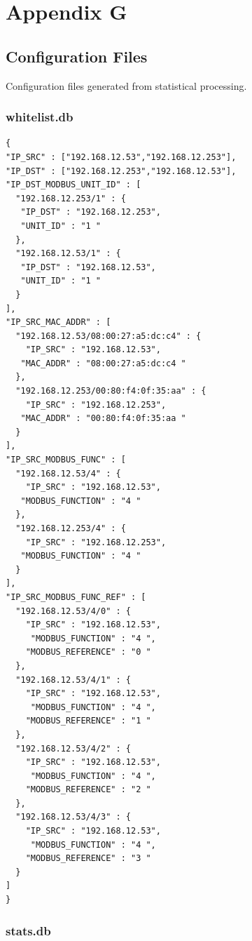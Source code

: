 \documentclass[11pt,a4paper]{article}
\begin{document}
\newpage

\section*{Appendix G}\label{appendix-g}

\subsection*{Configuration Files}\label{configuration-files}

Configuration files generated from statistical processing.

\subsubsection*{whitelist.db}\label{whitelist.db}

\begin{verbatim}
{
"IP_SRC" : ["192.168.12.53","192.168.12.253"],
"IP_DST" : ["192.168.12.253","192.168.12.53"],
"IP_DST_MODBUS_UNIT_ID" : [
  "192.168.12.253/1" : {
   "IP_DST" : "192.168.12.253",
   "UNIT_ID" : "1 "
  },
  "192.168.12.53/1" : {
   "IP_DST" : "192.168.12.53",
   "UNIT_ID" : "1 "
  }
],
"IP_SRC_MAC_ADDR" : [
  "192.168.12.53/08:00:27:a5:dc:c4" : {
    "IP_SRC" : "192.168.12.53",
   "MAC_ADDR" : "08:00:27:a5:dc:c4 "
  },
  "192.168.12.253/00:80:f4:0f:35:aa" : {
    "IP_SRC" : "192.168.12.253",
   "MAC_ADDR" : "00:80:f4:0f:35:aa "
  }
],
"IP_SRC_MODBUS_FUNC" : [
  "192.168.12.53/4" : {
    "IP_SRC" : "192.168.12.53",
   "MODBUS_FUNCTION" : "4 "
  },
  "192.168.12.253/4" : {
    "IP_SRC" : "192.168.12.253",
   "MODBUS_FUNCTION" : "4 "
  }
],
"IP_SRC_MODBUS_FUNC_REF" : [
  "192.168.12.53/4/0" : {
    "IP_SRC" : "192.168.12.53",
     "MODBUS_FUNCTION" : "4 ",
    "MODBUS_REFERENCE" : "0 "
  },
  "192.168.12.53/4/1" : {
    "IP_SRC" : "192.168.12.53",
     "MODBUS_FUNCTION" : "4 ",
    "MODBUS_REFERENCE" : "1 "
  },
  "192.168.12.53/4/2" : {
    "IP_SRC" : "192.168.12.53",
     "MODBUS_FUNCTION" : "4 ",
    "MODBUS_REFERENCE" : "2 "
  },
  "192.168.12.53/4/3" : {
    "IP_SRC" : "192.168.12.53",
     "MODBUS_FUNCTION" : "4 ",
    "MODBUS_REFERENCE" : "3 "
  }
]
}
\end{verbatim}

\newpage

\subsubsection*{stats.db}\label{stats.db}
\end{document}
